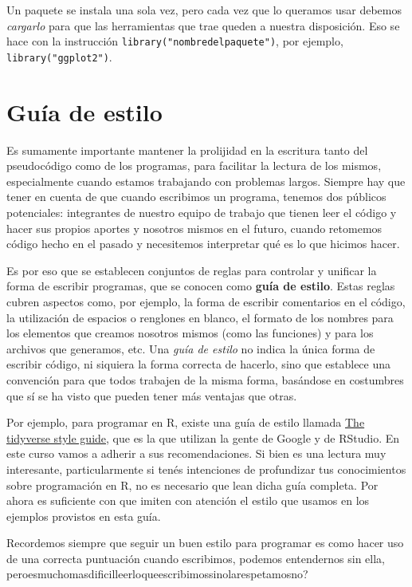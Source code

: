 \documentclass[
]{book}
\begin{document}
Un paquete se instala una sola vez, pero cada vez que lo queramos usar debemos \emph{cargarlo} para que las herramientas que trae queden a nuestra disposición. Eso se hace con la instrucción \texttt{library("nombredelpaquete")}, por ejemplo, \texttt{library("ggplot2")}.

\hypertarget{guuxeda-de-estilo}{%
\section{Guía de estilo}\label{guuxeda-de-estilo}}

Es sumamente importante mantener la prolijidad en la escritura tanto del pseudocódigo como de los programas, para facilitar la lectura de los mismos, especialmente cuando estamos trabajando con problemas largos. Siempre hay que tener en cuenta de que cuando escribimos un programa, tenemos dos públicos potenciales: integrantes de nuestro equipo de trabajo que tienen leer el código y hacer sus propios aportes y nosotros mismos en el futuro, cuando retomemos código hecho en el pasado y necesitemos interpretar qué es lo que hicimos hacer.

Es por eso que se establecen conjuntos de reglas para controlar y unificar la forma de escribir programas, que se conocen como \textbf{guía de estilo}. Estas reglas cubren aspectos como, por ejemplo, la forma de escribir comentarios en el código, la utilización de espacios o renglones en blanco, el formato de los nombres para los elementos que creamos nosotros mismos (como las funciones) y para los archivos que generamos, etc. Una \emph{guía de estilo} no indica la única forma de escribir código, ni siquiera la forma correcta de hacerlo, sino que establece una convención para que todos trabajen de la misma forma, basándose en costumbres que sí se ha visto que pueden tener más ventajas que otras.

Por ejemplo, para programar en R, existe una guía de estilo llamada \href{https://style.tidyverse.org/}{The tidyverse style guide}, que es la que utilizan la gente de Google y de RStudio. En este curso vamos a adherir a sus recomendaciones. Si bien es una lectura muy interesante, particularmente si tenés intenciones de profundizar tus conocimientos sobre programación en R, no es necesario que lean dicha guía completa. Por ahora es suficiente con que imiten con atención el estilo que usamos en los ejemplos provistos en esta guía.

Recordemos siempre que seguir un buen estilo para programar es como hacer uso de una correcta puntuación cuando escribimos, podemos entendernos sin ella, peroesmuchomasdificilleerloqueescribimossinolarespetamosno?
\end{document}
